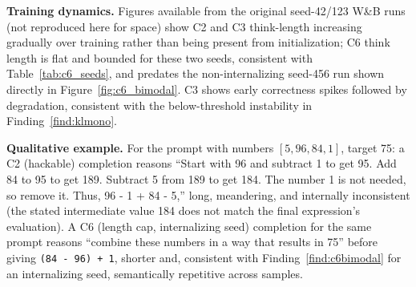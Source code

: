 \documentclass{article}
\begin{document}
\textbf{Training dynamics.} Figures available from the original seed-42/123 W\&B runs (not reproduced here for space) show C2 and C3 think-length increasing gradually over training rather than being present from initialization; C6 think length is flat and bounded for these two seeds, consistent with Table~\ref{tab:c6_seeds}, and predates the non-internalizing seed-456 run shown directly in Figure~\ref{fig:c6_bimodal}. C3 shows early correctness spikes followed by degradation, consistent with the below-threshold instability in Finding~\ref{find:klmono}.

\textbf{Qualitative example.} For the prompt with numbers $[5, 96, 84, 1]$, target 75: a C2 (hackable) completion reasons ``Start with 96 and subtract 1 to get 95. Add 84 to 95 to get 189. Subtract 5 from 189 to get 184. The number 1 is not needed, so remove it. Thus, 96 - 1 + 84 - 5,'' long, meandering, and internally inconsistent (the stated intermediate value 184 does not match the final expression's evaluation). A C6 (length cap, internalizing seed) completion for the same prompt reasons ``combine these numbers in a way that results in 75'' before giving \texttt{(84 - 96) + 1}, shorter and, consistent with Finding~\ref{find:c6bimodal} for an internalizing seed, semantically repetitive across samples.

\newpage

\end{document}
